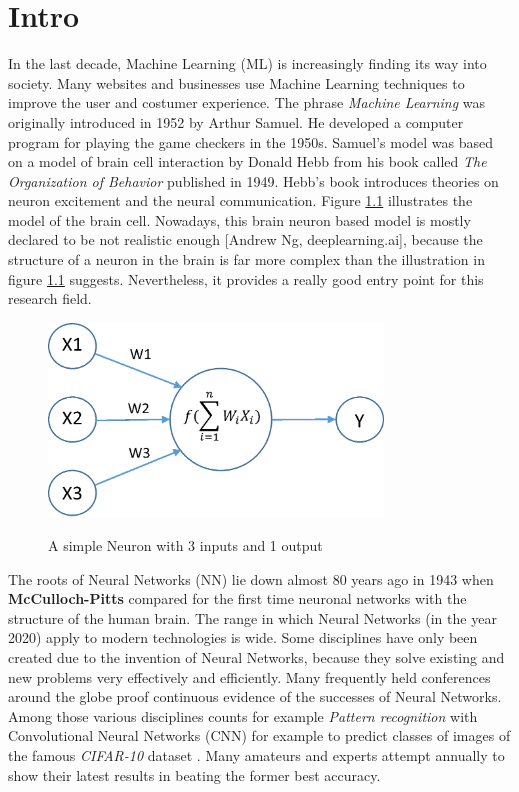 \chapter{Intro}\label{ch:intro}

In the last decade, Machine Learning (ML) is increasingly finding its way into society. Many websites and businesses use Machine Learning techniques to improve the user and costumer experience. The phrase \textit{Machine Learning} was originally introduced in 1952 by Arthur Samuel. He developed a computer program for playing the game checkers in the 1950s. Samuel's model was based on a model of brain cell interaction by Donald Hebb from his book called \textit{The Organization of Behavior} published in 1949. Hebb's book introduces theories on neuron excitement and the neural communication. Figure \ref{neuron} illustrates the model of the brain cell. Nowadays, this brain neuron based model is mostly declared to be not realistic enough [Andrew Ng, deeplearning.ai], because the structure of a neuron in the brain is far more complex than the illustration in figure \ref{neuron} suggests. Nevertheless, it provides a really good entry point for this research field. 

\begin{figure}
  \begin{center}
  \includegraphics[width=3.5in]{photos/neuron}\\
  \caption{A simple Neuron with 3 inputs and 1 output \cite{neuron}}\label{neuron}
  \end{center}
\end{figure}
 
The roots of Neural Networks (NN) lie down almost 80 years ago in 1943 when \textbf{McCulloch-Pitts} \cite{NN} compared for the first time neuronal networks with the structure of the human brain. The range in which Neural Networks (in the year 2020) apply to modern technologies is wide. Some disciplines have only been created due to the invention of Neural Networks, because they solve existing and new problems very effectively and efficiently. Many frequently held conferences around the globe proof continuous evidence of the successes of Neural Networks. Among those various disciplines counts for example \textit{Pattern recognition} with Convolutional Neural Networks (CNN) \cite{cnn} for example to predict classes of images of the famous \textit{CIFAR-10} dataset \cite{cifar}. Many amateurs \cite{tim} and experts attempt annually to show their latest results in beating the former best accuracy. 

